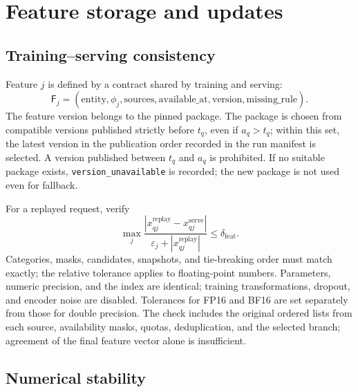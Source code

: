 \documentclass[12pt,a4paper]{article}
\newcommand{\code}[1]{{\ttfamily\small\nolinkurl{#1}}}
\newcommand{\eps}{\varepsilon}
\newcommand{\abs}[1]{\left|#1\right|}
\theoremstyle{plainru}
\begin{document}
\section{Feature storage and updates}\label{sec:operations-features}

\subsection{Training--serving consistency}

Feature \(j\) is defined by a contract shared by training and serving:
\begin{equation}\label{eq:ops-feature-contract}
\mathsf F_j=(\mathrm{entity},\phi_j,\mathrm{sources},
\mathrm{available\_at},\mathrm{version},\mathrm{missing\_rule}).
\end{equation}
The feature version belongs to the pinned package. The package is chosen from
compatible versions published strictly before $t_q$, even if
$a_q>t_q$; within this set, the latest version in the publication order
recorded in the run manifest is selected. A version published between $t_q$ and $a_q$ is prohibited.
If no suitable package exists, \code{version_unavailable} is recorded;
the new package is not used even for fallback.

For a replayed request, verify
\begin{equation}\label{eq:ops-feature-parity}
\max_j\frac{\abs{x^{\mathrm{replay}}_{qj}-x^{\mathrm{serve}}_{qj}}}
{\eps_j+\abs{x^{\mathrm{replay}}_{qj}}}\le\delta_{\mathrm{feat}}.
\end{equation}
Categories, masks, candidates, snapshots, and tie-breaking order
must match exactly; the relative tolerance applies to floating-point
numbers. Parameters, numeric precision, and the index are identical; training transformations,
dropout, and encoder noise are disabled.
Tolerances for FP16 and BF16 are set separately from those for double precision.
The check includes the original ordered lists from each source,
availability masks, quotas, deduplication, and the selected branch;
agreement of the final feature vector alone is insufficient.

\subsection{Numerical stability}\label{sec:ops-numerics}
\end{document}
